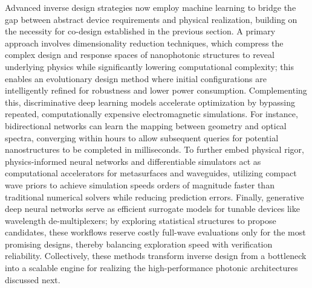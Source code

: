\documentclass[11pt]{article}
\begin{document}
Advanced inverse design strategies now employ machine learning to bridge the gap between abstract device requirements and physical realization, building on the necessity for co-design established in the previous section. A primary approach involves dimensionality reduction techniques, which compress the complex design and response spaces of nanophotonic structures to reveal underlying physics while significantly lowering computational complexity; this enables an evolutionary design method where initial configurations are intelligently refined for robustness and lower power consumption. Complementing this, discriminative deep learning models accelerate optimization by bypassing repeated, computationally expensive electromagnetic simulations. For instance, bidirectional networks can learn the mapping between geometry and optical spectra, converging within hours to allow subsequent queries for potential nanostructures to be completed in milliseconds. To further embed physical rigor, physics-informed neural networks and differentiable simulators act as computational accelerators for metasurfaces and waveguides, utilizing compact wave priors to achieve simulation speeds orders of magnitude faster than traditional numerical solvers while reducing prediction errors. Finally, generative deep neural networks serve as efficient surrogate models for tunable devices like wavelength de-multiplexers; by exploring statistical structures to propose candidates, these workflows reserve costly full-wave evaluations only for the most promising designs, thereby balancing exploration speed with verification reliability. Collectively, these methods transform inverse design from a bottleneck into a scalable engine for realizing the high-performance photonic architectures discussed next. \citep{doi_10_1117_12_2595199_6f40f1c0} \citep{doi_10_1515_nanoph_2021_0660_2d91a441} \citep{doi_10_48550_arxiv_2209_10098_b3bedb78} \citep{doi_10_1109_access_2026_3697666_bd5258a6}
\end{document}
